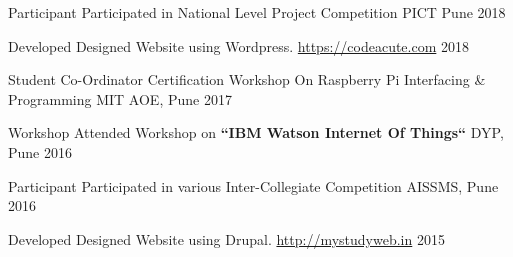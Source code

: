 \vspace{-17pt}



\begin{cvhonors}

\cvhonor
{Participant} %
{Participated in National Level Project Competition\vspace{2pt}} %
{PICT Pune} %
{\vspace{2pt}2018} %


\cvhonor
{Developed} %
{Designed Website using Wordpress. \url{https://codeacute.com}\vspace{2pt}} %
{} %
{\vspace{2pt}2018} %


\cvhonor
{Student Co-Ordinator} %
{Certification Workshop On Raspberry Pi Interfacing \& Programming\vspace{2pt}} %
{MIT AOE, Pune} %
{\vspace{2pt}2017} %

\cvhonor
{Workshop} %
{Attended Workshop on \textbf{“IBM Watson Internet Of Things“}\vspace{2pt}} %
{DYP, Pune} %
{\vspace{2pt}2016} %

\cvhonor
{Participant} %
{Participated in various Inter-Collegiate Competition\vspace{2pt}} %
{AISSMS, Pune} %
{\vspace{2pt}2016} %
    

\cvhonor
{Developed} %
{Designed Website using Drupal. \url{http://mystudyweb.in}\vspace{2pt}} %
{} %
{\vspace{2pt}2015} %


\end{cvhonors}
